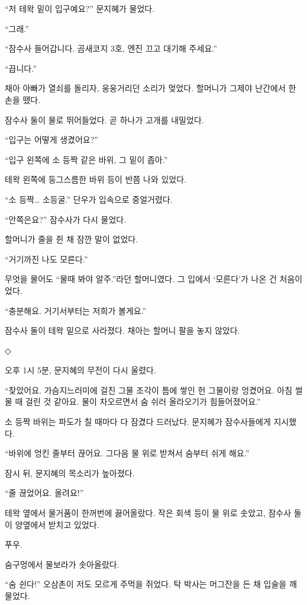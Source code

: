 \documentclass[
  korean,
  letterpaper,
  twoside,
  open=any,
  fontsize=12.5pt,
  headings=small]{scrbook}
\begin{document}
``저 테왁 밑이 입구예요?''
문지혜가 물었다.

``그래.''

``잠수사 들어갑니다. 곰새코지
3호, 엔진 끄고 대기해
주세요.''

``끕니다.''

채아 아빠가 열쇠를 돌리자,
웅웅거리던 소리가 멎었다.
할머니가 그제야 난간에서 한
손을 뗐다.

잠수사 둘이 물로 뛰어들었다.
곧 하나가 고개를 내밀었다.

``입구는 어떻게 생겼어요?''

``입구 왼쪽에 소 등짝 같은
바위, 그 밑이 좁아.''

테왁 왼쪽에 둥그스름한 바위
등이 반쯤 나와 있었다.

``소 등짝\ldots{} 소등굴.''
단우가 입속으로 중얼거렸다.

``안쪽은요?'' 잠수사가 다시
물었다.

할머니가 줄을 쥔 채 잠깐 말이
없었다.

``거기까진 나도 모른다.''

무엇을 물어도 ``물때 봐야
알주.''라던 할머니였다. 그
입에서 `모른다'가 나온 건
처음이었다.

``충분해요. 거기서부터는
저희가 볼게요.''

잠수사 둘이 테왁 밑으로
사라졌다. 채아는 할머니 팔을
놓지 않았다.

\begin{center}◇\end{center}\nopagebreak

오후 1시 5분, 문지혜의 무전이
다시 울렸다.

``찾았어요. 가슴지느러미에
걸친 그물 조각이 틈에 쌓인 헌
그물이랑 엉켰어요. 아침 썰물
때 걸린 것 같아요. 물이
차오르면서 숨 쉬러 올라오기가
힘들어졌어요.''

소 등짝 바위는 파도가 칠
때마다 다 잠겼다 드러났다.
문지혜가 잠수사들에게
지시했다.

``바위에 엉킨 줄부터 끊어요.
그다음 물 위로 받쳐서 숨부터
쉬게 해요.''

잠시 뒤, 문지혜의 목소리가
높아졌다.

``줄 끊었어요. 올려요!''

테왁 옆에서 물거품이 한꺼번에
끓어올랐다. 작은 회색 등이 물
위로 솟았고, 잠수사 둘이
양옆에서 받치고 있었다.

푸우.

숨구멍에서 물보라가
솟아올랐다.

``숨 쉰다!'' 오삼촌이 저도
모르게 주먹을 쥐었다. 탁
박사는 머그잔을 든 채 입술을
깨물었다.
\end{document}

